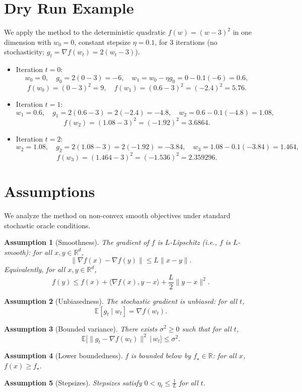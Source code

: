 \documentclass[11pt]{article}
\newtheorem{assumption}{Assumption}
\begin{document}
\section*{Dry Run Example}
We apply the method to the deterministic quadratic $f(w)=(w-3)^2$ in one dimension with $w_0=0$, constant stepsize $\eta=0.1$, for $3$ iterations (no stochasticity; $g_t = \nabla f(w_t)=2(w_t-3)$).
\begin{itemize}
    \item Iteration $t=0$:
    \[
        w_0=0,\quad g_0=2(0-3)=-6,\quad w_1=w_0-\eta g_0=0-0.1(-6)=0.6,
    \]
    \[
        f(w_0)=(0-3)^2=9,\quad f(w_1)=(0.6-3)^2=(-2.4)^2=5.76.
    \]
    \item Iteration $t=1$:
    \[
        w_1=0.6,\quad g_1=2(0.6-3)=2(-2.4)=-4.8,\quad w_2=0.6-0.1(-4.8)=1.08,
    \]
    \[
        f(w_2)=(1.08-3)^2=(-1.92)^2=3.6864.
    \]
    \item Iteration $t=2$:
    \[
        w_2=1.08,\quad g_2=2(1.08-3)=2(-1.92)=-3.84,\quad w_3=1.08-0.1(-3.84)=1.464,
    \]
    \[
        f(w_3)=(1.464-3)^2=(-1.536)^2=2.359296.
    \]
\end{itemize}

\section*{Assumptions}
We analyze the method on non-convex smooth objectives under standard stochastic oracle conditions.
\begin{assumption}[Smoothness]
\label{assump:smooth}
The gradient of $f$ is $L$-Lipschitz (i.e., $f$ is $L$-smooth): for all $x,y\in\mathbb{R}^d$,
\[
\|\nabla f(x)-\nabla f(y)\| \le L \|x-y\|.
\]
Equivalently, for all $x,y\in\mathbb{R}^d$,
\[
f(y) \le f(x) + \langle \nabla f(x), y-x \rangle + \frac{L}{2}\|y-x\|^2.
\]
\end{assumption}
\begin{assumption}[Unbiasedness]
\label{assump:unbiased}
The stochastic gradient is unbiased: for all $t$,
\[
\mathbb{E}[g_t \mid w_t] = \nabla f(w_t).
\]
\end{assumption}
\begin{assumption}[Bounded variance]
\label{assump:var}
There exists $\sigma^2 \ge 0$ such that for all $t$,
\[
\mathbb{E}\big[\|g_t - \nabla f(w_t)\|^2 \,\big|\, w_t\big] \le \sigma^2.
\]
\end{assumption}
\begin{assumption}[Lower boundedness]
\label{assump:lower}
$f$ is bounded below by $f_\star \in \mathbb{R}$: for all $x$, $f(x) \ge f_\star$.
\end{assumption}
\begin{assumption}[Stepsizes]
\label{assump:stepsizes}
Stepsizes satisfy $0<\eta_t \le \frac{1}{L}$ for all $t$.
\end{assumption}
\end{document}
